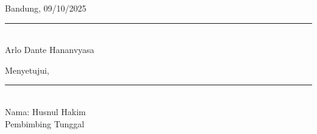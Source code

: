 \documentclass[12pt,a4paper]{article}
\begin{document}
	\begin{center}
		Bandung, 09/10/2025 \\[2cm] 
		\rule{5cm}{0.4pt} \\
		Arlo Dante Hananvyasa
	\end{center}
	
	\vspace{1cm}
	
	\begin{center}
		Menyetujui, \\[2cm]
		\rule{5cm}{0.4pt} \\
		Nama: Husnul Hakim \\
		Pembimbing Tunggal
	\end{center}
	
	
\end{document}
